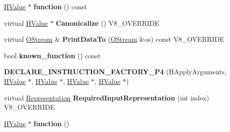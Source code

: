 \begin{DoxyCompactItemize}
\item 
\hypertarget{classv8_1_1internal_1_1_v8___f_i_n_a_l_ac6cf6a8016ce1ebef76f41f2c27c9086}{}\hyperlink{classv8_1_1internal_1_1_h_value}{H\+Value} $\ast$ {\bfseries function} () const \label{classv8_1_1internal_1_1_v8___f_i_n_a_l_ac6cf6a8016ce1ebef76f41f2c27c9086}

\item 
\hypertarget{classv8_1_1internal_1_1_v8___f_i_n_a_l_aad5f871e0a6782c02e742ec017eca3cd}{}virtual \hyperlink{classv8_1_1internal_1_1_h_value}{H\+Value} $\ast$ {\bfseries Canonicalize} () V8\+\_\+\+O\+V\+E\+R\+R\+I\+D\+E\label{classv8_1_1internal_1_1_v8___f_i_n_a_l_aad5f871e0a6782c02e742ec017eca3cd}

\item 
\hypertarget{classv8_1_1internal_1_1_v8___f_i_n_a_l_ac450dad970b14246be761ccf5004924b}{}virtual \hyperlink{classv8_1_1internal_1_1_o_stream}{O\+Stream} \& {\bfseries Print\+Data\+To} (\hyperlink{classv8_1_1internal_1_1_o_stream}{O\+Stream} \&os) const V8\+\_\+\+O\+V\+E\+R\+R\+I\+D\+E\label{classv8_1_1internal_1_1_v8___f_i_n_a_l_ac450dad970b14246be761ccf5004924b}

\item 
\hypertarget{classv8_1_1internal_1_1_v8___f_i_n_a_l_a439e94f61ad1381dbad0b82944df4917}{}bool {\bfseries known\+\_\+function} () const \label{classv8_1_1internal_1_1_v8___f_i_n_a_l_a439e94f61ad1381dbad0b82944df4917}

\item 
\hypertarget{classv8_1_1internal_1_1_v8___f_i_n_a_l_a139095076616ffff6af027a9fe4738be}{}{\bfseries D\+E\+C\+L\+A\+R\+E\+\_\+\+I\+N\+S\+T\+R\+U\+C\+T\+I\+O\+N\+\_\+\+F\+A\+C\+T\+O\+R\+Y\+\_\+\+P4} (H\+Apply\+Arguments, \hyperlink{classv8_1_1internal_1_1_h_value}{H\+Value} $\ast$, \hyperlink{classv8_1_1internal_1_1_h_value}{H\+Value} $\ast$, \hyperlink{classv8_1_1internal_1_1_h_value}{H\+Value} $\ast$, \hyperlink{classv8_1_1internal_1_1_h_value}{H\+Value} $\ast$)\label{classv8_1_1internal_1_1_v8___f_i_n_a_l_a139095076616ffff6af027a9fe4738be}

\item 
\hypertarget{classv8_1_1internal_1_1_v8___f_i_n_a_l_a6c6d1f37f40b113d8f4062f1ffff7215}{}virtual \hyperlink{classv8_1_1internal_1_1_representation}{Representation} {\bfseries Required\+Input\+Representation} (int index) V8\+\_\+\+O\+V\+E\+R\+R\+I\+D\+E\label{classv8_1_1internal_1_1_v8___f_i_n_a_l_a6c6d1f37f40b113d8f4062f1ffff7215}

\item 
\hypertarget{classv8_1_1internal_1_1_v8___f_i_n_a_l_aafa16c84ec5aa3ee7b4f08e670d6a69f}{}\hyperlink{classv8_1_1internal_1_1_h_value}{H\+Value} $\ast$ {\bfseries function} ()\label{classv8_1_1internal_1_1_v8___f_i_n_a_l_aafa16c84ec5aa3ee7b4f08e670d6a69f}


\end{DoxyCompactItemize}
